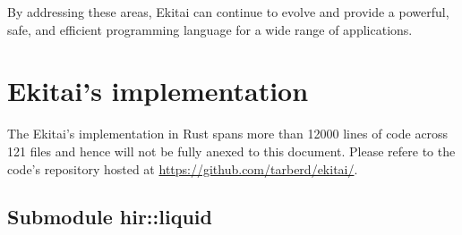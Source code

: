 \documentclass[
  oneside,
  english,
  coorientadorbanca,
  noabntexcite
]{ufsc-thesis-rn46-2019}
\begin{document}
By addressing these areas, Ekitai can continue to evolve and provide a powerful, safe, and efficient programming language for a wide range of applications.


\appendix

\chapter{Ekitai's implementation}\label{appendix:ekitai_github}
The Ekitai's implementation in Rust spans more than 12000 lines of code across 121 files and hence will not be fully anexed to this document.
Please refere to the code's repository hosted at \url{https://github.com/tarberd/ekitai/}.

\section{Submodule hir::liquid}
\end{document}
